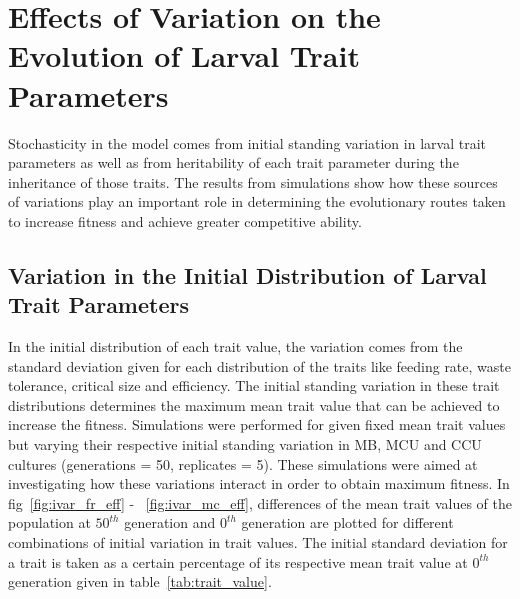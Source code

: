 \chapter{Effects of Variation on the Evolution of Larval Trait Parameters}
Stochasticity in the model comes from initial standing variation in larval trait parameters as well as from heritability of each trait parameter during the inheritance of those traits. The results from simulations show how these sources of variations play an important role in determining the evolutionary routes taken to increase fitness and achieve greater competitive ability.
\section{Variation in the Initial Distribution of Larval Trait Parameters}
In the initial distribution of each trait value, the variation comes from the standard deviation given for each distribution of the traits like feeding rate, waste tolerance, critical size and efficiency. The initial standing variation in these trait distributions determines the maximum mean trait value that can be achieved to increase the fitness. Simulations were performed for given fixed mean trait values but varying their respective initial standing variation in MB, MCU and CCU cultures (generations = 50, replicates = 5). These simulations were aimed at investigating how these variations interact in order to obtain maximum fitness. In fig~\ref{fig:ivar_fr_eff} - ~\ref{fig:ivar_mc_eff}, differences of the mean trait values of the population at $50^{th}$ generation and $0^{th}$ generation are plotted for different combinations of initial variation in trait values. The initial standard deviation for a trait is taken as a certain percentage of its respective mean trait value at $0^{th}$ generation given in table~\ref{tab:trait_value}.\\\\
